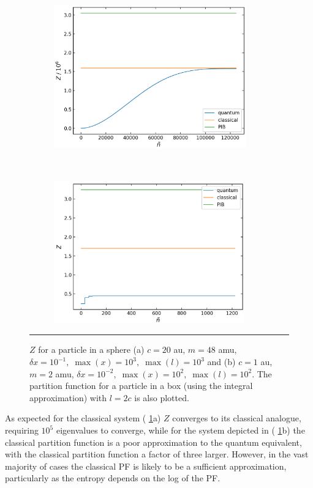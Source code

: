 \documentclass[../main.tex]{subfiles}
\begin{document}
\begin{figure}[h!]
	\begin{subfigure}[t]{0.49\textwidth}
		\centering
		\includegraphics[height=6.2cm]{4/figs/spherical_well_20_c_87456_m_point1_dx_pf}
		\caption{}
	\end{subfigure}%
	~ 
	\begin{subfigure}[t]{0.49\textwidth}
		\centering
		\includegraphics[height=6.2cm]{4/figs/spherical_well_1_c_3644_m_pf}
		\caption{}
	\end{subfigure}
	\vspace{0.2cm}
	\hrule
	\caption{$Z$ for a particle in a sphere (a) $c = 20$ au, $m = 48$ amu, $\delta x = 10^{-1},\;\max(x) = 10^3,\;\max(l) = 10^3$ and (b) $c = 1$ au, $m = 2$ amu, $\delta x = 10^{-2} ,\;\max(x) = 10^2,\;\max(l) = 10^2$. The partition function for a particle in a box (using the integral approximation) with $l = 2c$ is also plotted.} 
	\label{spherical_well_quantum_classical}
\end{figure}


As expected for the classical system (\figurename{ \ref{spherical_well_quantum_classical}}a) $Z$ converges to its classical analogue, requiring $10^5$ eigenvalues to converge, while for the system depicted in (\figurename{ \ref{spherical_well_quantum_classical}}b) the classical partition function is a poor approximation to the quantum equivalent, with the classical partition function a factor of three larger. However, in the vast majority of cases the classical PF is likely to be a sufficient approximation, particularly as the entropy depends on the log of the PF.
\end{document}

